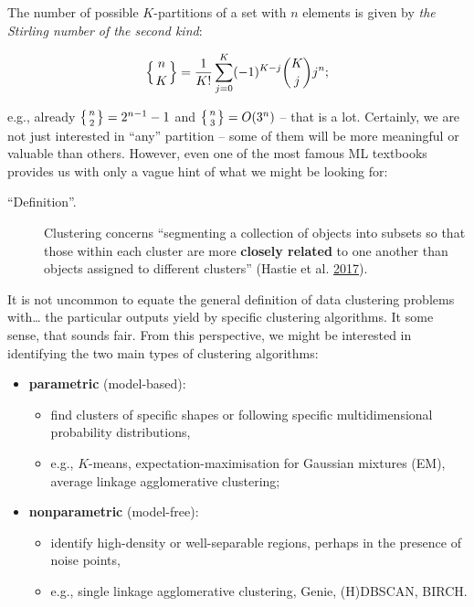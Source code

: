 \documentclass[10pt,b5paper,krantz1]{krantz}
\providecommand{\tightlist}{%
  \setlength{\itemsep}{0pt}\setlength{\parskip}{0pt}}
\begin{document}
The number of possible \(K\)-partitions of a set with \(n\) elements is given by
\emph{the Stirling number of the second kind}:

\[
\left\{{n \atop K}\right\}={\frac  {1}{K!}}\sum _{{j=0}}^{{K}}(-1)^{{K-j}}{\binom  {K}{j}}j^{n};
\]

e.g., already \(\left\{{n \atop 2}\right\}=2^{n-1}-1\)
and \(\left\{{n \atop 3}\right\}=O(3^n)\) -- that is a lot.
Certainly, we are not just interested in ``any'' partition -- some of them
will be more meaningful or valuable than others.
However, even one of the most famous ML textbooks provides us with only
a vague hint of what we might be looking for:

\begin{description}
\item[``Definition''.]
Clustering concerns ``segmenting a collection of objects into subsets
so that those within each cluster are more \textbf{closely related}
to one another than objects assigned to different clusters'' (Hastie et al. \protect\hyperlink{ref-esl}{2017}).
\end{description}

It is not uncommon
to equate the general definition of data clustering problems with\ldots{} the
particular outputs yield by specific clustering algorithms. It some sense,
that sounds fair. From this perspective, we might be interested in
identifying the two main types of clustering algorithms:

\begin{itemize}
\tightlist
\item
  \textbf{parametric} (model-based):

  \begin{itemize}
  \tightlist
  \item
    find clusters of specific shapes or following specific multidimensional
    probability distributions,
  \item
    e.g., \(K\)-means, expectation-maximisation for Gaussian mixtures (EM),
    average linkage agglomerative clustering;
  \end{itemize}
\item
  \textbf{nonparametric} (model-free):

  \begin{itemize}
  \tightlist
  \item
    identify high-density or well-separable regions,
    perhaps in the presence of noise points,
  \item
    e.g., single linkage agglomerative clustering, Genie, (H)DBSCAN, BIRCH.
  \end{itemize}
\end{itemize}
\end{document}
